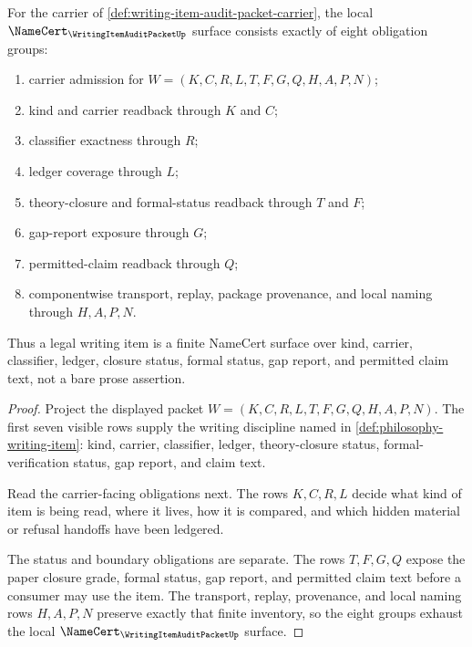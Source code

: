\begin{theorem}
\label{thm:writing-item-audit-packet-namecert-obligations}
For the carrier of \autoref{def:writing-item-audit-packet-carrier}, the local $\NameCert_{\WritingItemAuditPacketUp}$ surface consists exactly of eight obligation groups:
\begin{enumerate}
\item carrier admission for $W=(K,C,R,L,T,F,G,Q,H,A,P,N)$;
\item kind and carrier readback through $K$ and $C$;
\item classifier exactness through $R$;
\item ledger coverage through $L$;
\item theory-closure and formal-status readback through $T$ and $F$;
\item gap-report exposure through $G$;
\item permitted-claim readback through $Q$;
\item componentwise transport, replay, package provenance, and local naming through $H,A,P,N$.
\end{enumerate}
Thus a legal writing item is a finite NameCert surface over kind, carrier, classifier, ledger, closure status, formal status, gap report, and permitted claim text, not a bare prose assertion.
\end{theorem}
\begin{proof}
Project the displayed packet $W=(K,C,R,L,T,F,G,Q,H,A,P,N)$. The first seven visible rows supply the writing discipline named in \autoref{def:philosophy-writing-item}: kind, carrier, classifier, ledger, theory-closure status, formal-verification status, gap report, and claim text.

Read the carrier-facing obligations next. The rows $K,C,R,L$ decide what kind of item is being read, where it lives, how it is compared, and which hidden material or refusal handoffs have been ledgered.

The status and boundary obligations are separate. The rows $T,F,G,Q$ expose the paper closure grade, formal status, gap report, and permitted claim text before a consumer may use the item. The transport, replay, provenance, and local naming rows $H,A,P,N$ preserve exactly that finite inventory, so the eight groups exhaust the local $\NameCert_{\WritingItemAuditPacketUp}$ surface.
\end{proof}

